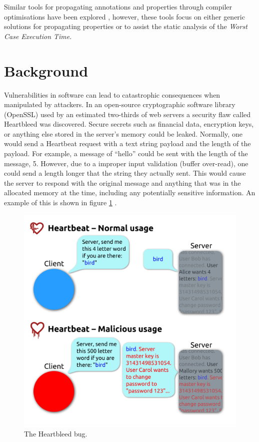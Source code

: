 \documentclass[twocolumn]{article}
\begin{document}
Similar tools for propagating annotations and properties through compiler optimisations have been explored \cite{vu2020secure} \cite{schommer2018embedded} \cite{leroy2016compcert}, however, these tools focus on either generic solutions for propagating properties or to assist the static analysis of the \textit{Worst Case Execution Time}.

\section{Background}
Vulnerabilities in software can lead to catastrophic consequences when manipulated by attackers. In an open-source cryptographic software library (OpenSSL) used by an estimated two-thirds of web servers \cite{heartbleed} a security flaw called Heartbleed was discovered. Secure secrets such as financial data, encryption keys, or anything else stored in the server's memory could be leaked. Normally, one would send a Heartbeat request with a text string payload and the length of the payload. For example, a message of ``hello'' could be sent with the length of the message, 5. However, due to a improper input validation (buffer over-read), one could send a length longer that the string they actually sent. This would cause the server to respond with the original message and anything that was in the allocated memory at the time, including any potentially sensitive information. An example of this is shown in figure \ref{fig:heartbleed} \cite{heartbleedimg}.

\begin{figure}
    \centering
    \includegraphics[width=\linewidth]{heartbleed.png}
    \caption{The Heartbleed bug. \cite{heartbleedimg}}
    \label{fig:heartbleed}
\end{figure}
\end{document}
